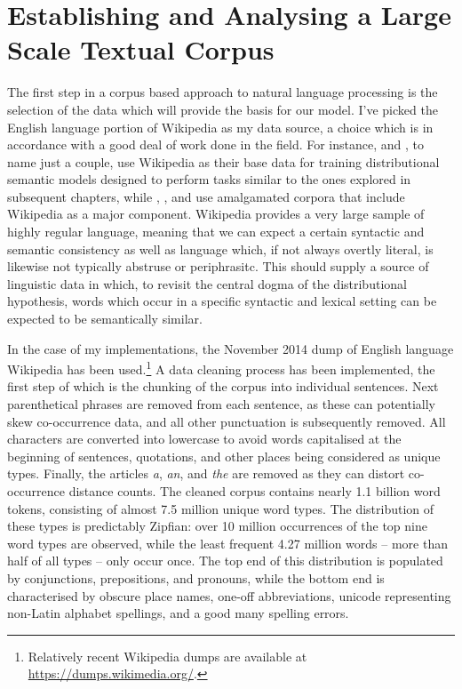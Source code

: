 \section{Establishing and Analysing a Large Scale Textual Corpus}
The first step in a corpus based approach to natural language processing is the selection of the data which will provide the basis for our model.  I've picked the English language portion of Wikipedia as my data source, a choice which is in accordance with a good deal of work done in the field.  For instance, \cite{GabrilovichEA2007} and \cite{CollobertEA2008}, to name just a couple, use Wikipedia as their base data for training distributional semantic models designed to perform tasks similar to the ones explored in subsequent chapters, while \cite{Baroni2014}, \cite{PenningtonEA2014}, and \cite{GutierrezEA2016} use amalgamated corpora that include Wikipedia as a major component.  Wikipedia provides a very large sample of highly regular language, meaning that we can expect a certain syntactic and semantic consistency as well as language which, if not always overtly literal, is likewise not typically abstruse or periphrasitc.  This should supply a source of linguistic data in which, to revisit the central dogma of the distributional hypothesis, words which occur in a specific syntactic and lexical setting can be expected to be semantically similar.

In the case of my implementations, the November 2014 dump of English language Wikipedia has been used.\footnote{Relatively recent Wikipedia dumps are available at \url{https://dumps.wikimedia.org/}.}  A data cleaning process has been implemented, the first step of which is the chunking of the corpus into individual sentences.  Next parenthetical phrases are removed from each sentence, as these can potentially skew co-occurrence data, and all other punctuation is subsequently removed.  All characters are converted into lowercase to avoid words capitalised at the beginning of sentences, quotations, and other places being considered as unique types.  Finally, the articles \emph{a}, \emph{an}, and \emph{the} are removed as they can distort co-occurrence distance counts.  The cleaned corpus contains nearly 1.1 billion word tokens, consisting of almost 7.5 million unique word types.  The distribution of these types is predictably Zipfian: over 10 million occurrences of the top nine word types are observed, while the least frequent 4.27 million words -- more than half of all types -- only occur once.  The top end of this distribution is populated by conjunctions, prepositions, and pronouns, while the bottom end is characterised by obscure place names, one-off abbreviations, unicode representing non-Latin alphabet spellings, and a good many spelling errors.


